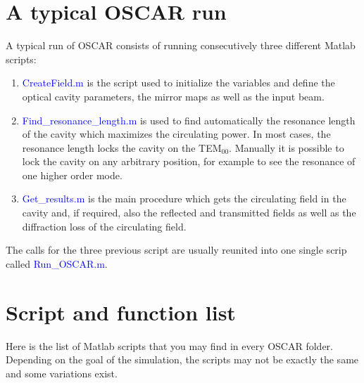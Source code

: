 \section{A typical OSCAR run}

A typical run of OSCAR consists of running consecutively three different Matlab scripts:

\begin{enumerate}
  \item \textcolor{blue}{CreateField.m} is the script used to initialize the variables and define the optical cavity parameters, the mirror maps as well as the input beam.
  \item \textcolor{blue}{Find\_resonance\_length.m} is used to find automatically the resonance length of the cavity which maximizes the circulating power. In most cases, the resonance length locks the cavity on the TEM$_{00}$. Manually it is possible to lock the cavity on any arbitrary position, for example to see the resonance of one higher order mode.
  \item \textcolor{blue}{Get\_results.m} is the main procedure which gets the circulating field in the cavity and, if required, also the reflected and transmitted fields as well as the diffraction loss of the circulating field.
\end{enumerate}

The calls for the three previous script are usually reunited into one single scrip called \textcolor{blue}{Run\_OSCAR.m}.

\section{Script and function list}

Here is the list of Matlab scripts that you may find in every OSCAR folder. Depending on the goal of the simulation, the scripts may not be exactly the same and some variations exist.

